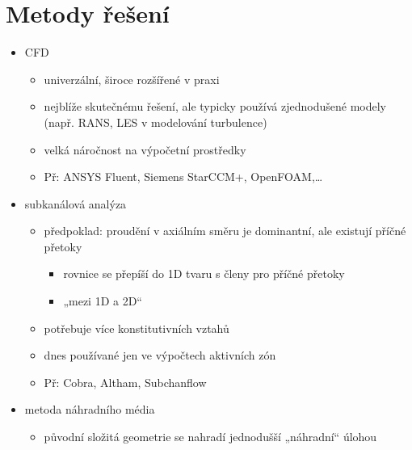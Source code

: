 \documentclass[letterpaper,10pt,czech]{sphinxmanual}
\begin{document}
\section{Metody řešení}
\label{\detokenize{prednaska_19092022:metody-reseni}}\begin{itemize}
\item {} 
\sphinxAtStartPar
CFD
\begin{itemize}
\item {} 
\sphinxAtStartPar
univerzální, široce rozšířené v praxi

\item {} 
\sphinxAtStartPar
nejblíže skutečnému řešení, ale typicky používá zjednodušené modely (např. RANS, LES v modelování turbulence)

\item {} 
\sphinxAtStartPar
velká náročnost na výpočetní prostředky

\item {} 
\sphinxAtStartPar
Př: ANSYS Fluent, Siemens StarCCM+, OpenFOAM,…

\end{itemize}

\item {} 
\sphinxAtStartPar
subkanálová analýza
\begin{itemize}
\item {} 
\sphinxAtStartPar
předpoklad: proudění v axiálním směru je dominantní, ale existují příčné přetoky
\begin{itemize}
\item {} 
\sphinxAtStartPar
rovnice se přepíší do 1D tvaru s členy pro příčné přetoky

\item {} 
\sphinxAtStartPar
„mezi 1D a 2D“

\end{itemize}

\item {} 
\sphinxAtStartPar
potřebuje více konstitutivních vztahů

\item {} 
\sphinxAtStartPar
dnes používané jen ve výpočtech aktivních zón

\item {} 
\sphinxAtStartPar
Př: Cobra, Altham, Subchanflow

\end{itemize}

\item {} 
\sphinxAtStartPar
metoda náhradního média
\begin{itemize}
\item {} 
\sphinxAtStartPar
původní složitá geometrie se nahradí jednodušší „náhradní“ úlohou


\end{itemize}
\end{itemize}
\end{document}
